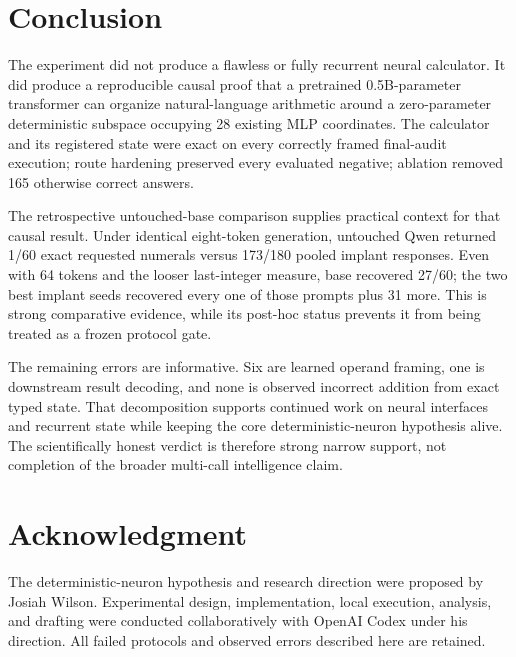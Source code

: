 \documentclass[11pt]{article}
\begin{document}
\section{Conclusion}

The experiment did not produce a flawless or fully recurrent neural
calculator. It did produce a reproducible causal proof that a pretrained
0.5B-parameter transformer can organize natural-language arithmetic around a
zero-parameter deterministic subspace occupying 28 existing MLP coordinates.
The calculator and its registered state were exact on every correctly framed
final-audit execution; route hardening preserved every evaluated negative;
ablation removed 165 otherwise correct answers.

The retrospective untouched-base comparison supplies practical context for
that causal result. Under identical eight-token generation, untouched Qwen
returned 1/60 exact requested numerals versus 173/180 pooled implant responses.
Even with 64 tokens and the looser last-integer measure, base recovered 27/60;
the two best implant seeds recovered every one of those prompts plus 31 more.
This is strong comparative evidence, while its post-hoc status prevents it
from being treated as a frozen protocol gate.

The remaining errors are informative. Six are learned operand framing, one is
downstream result decoding, and none is observed incorrect addition from exact
typed state. That decomposition supports continued work on neural interfaces
and recurrent state while keeping the core deterministic-neuron hypothesis
alive. The scientifically honest verdict is therefore strong narrow support,
not completion of the broader multi-call intelligence claim.

\section*{Acknowledgment}

The deterministic-neuron hypothesis and research direction were proposed by
Josiah Wilson. Experimental design, implementation, local execution, analysis,
and drafting were conducted collaboratively with OpenAI Codex under his
direction. All failed protocols and observed errors described here are
retained.
\end{document}
